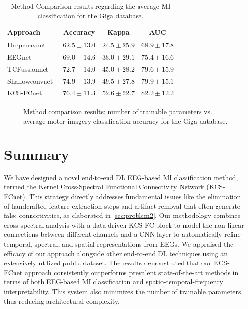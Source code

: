 \begin{table}[H]
    \caption{Method Comparison results regarding the average MI classification for the Giga database.}\label{table:compmod}
    \centering
    \begin{tabular}{lccc}
        \toprule
        \textbf{Approach}         &  \textbf{Accuracy}  & \textbf{Kappa}  & \textbf{AUC}  \\ 
        \midrule
        Deepconvnet~\cite{schirrmeister2017deep}    & $62.5 \pm 13.0$  & $24.5 \pm 25.9$   & $68.9 \pm 17.8$  \\ 
        EEGnet~\cite{lawhern2018eegnet}             & $69.0 \pm 14.6$  & $38.0 \pm 29.1$   & $75.4 \pm 16.6$  \\ 
        TCFussionnet~\cite{musallam2021electroencephalography}   & $72.7 \pm 14.0$  & $45.0 \pm 28.2$   & $79.6 \pm 15.9$  \\ 
        Shallowconvnet~\cite{schirrmeister2017deep} & $74.9 \pm 13.9$  & $49.5 \pm 27.8$   & $79.9 \pm 15.1$  \\ 
        \midrule
        KCS-FCnet                   & \textbf{$76.4 \pm 11.3$}  &  \textbf{$52.6 \pm 22.7$}  & \textbf{$82.2 \pm 12.2$}  \\ 
        \bottomrule
    \end{tabular}
\end{table}

\vspace{-6pt}
\begin{figure}[h!]
    \centering
    \resizebox{0.9\linewidth}{!}{}
    \caption{{Method}
        comparison results: number of trainable parameters vs. average motor imagery classification accuracy for the Giga database.}\label{fig:paramsvsacc}
\end{figure}


\section{Summary}

We have designed a novel end-to-end DL EEG-based MI classification method, termed the Kernel Cross-Spectral Functional Connectivity Network (KCS-FCnet). This strategy directly addresses fundamental issues like the elimination of handcrafted feature extraction steps and artifact removal that often generate false connectivities, as elaborated in \cref{sec:problem2}. Our methodology combines cross-spectral analysis with a data-driven KCS-FC block to model the non-linear connections between different channels and a CNN layer to automatically refine temporal, spectral, and spatial representations from EEGs. We appraised the efficacy of our approach alongside other end-to-end DL techniques using an extensively utilized public dataset. The results demonstrated that our KCS-FCnet approach consistently outperforms prevalent state-of-the-art methods in terms of both EEG-based MI classification and spatio-temporal-frequency interpretability. This system also minimizes the number of trainable parameters, thus reducing architectural complexity.

